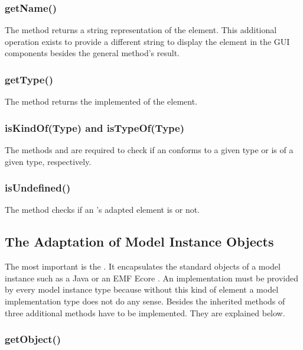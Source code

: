 \subsubsection{getName()}

The method  returns a string representation of the element. 
This additional operation exists to provide a different string to display the
element in the GUI components besides the general  method's
result.

\subsubsection{getType()}

The method  returns the implemented  of the element.

\subsubsection{isKindOf(Type) and isTypeOf(Type)}

The methods  and  are required to
check if an  conforms to a given type or is 
of a given type, respectively.

\subsubsection{isUndefined()}

The method  checks if an 's
adapted element is  or not.


\subsection{The Adaptation of Model Instance Objects}

The most important  is
the . It encapsulates the standard objects of a model
instance such as a Java  or an \acs{EMF} Ecore . An
 implementation must be provided by every model
instance type because without this kind of element a model implementation type
does not do any sense. Besides the inherited methods of
 three additional methods have to be implemented.
They are explained below.
 
\subsubsection{getObject()}

